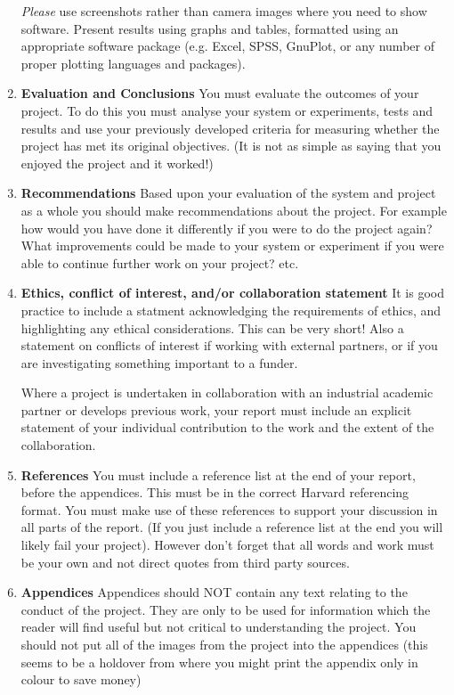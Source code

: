 \begin{enumerate}
    \textit{Please} use screenshots rather than camera images where you need to show software. Present results using graphs and tables, formatted using an appropriate software package (e.g. Excel, SPSS, GnuPlot, or any number of proper plotting languages and packages).

    \item \textbf{Evaluation and Conclusions}
    \subitem You must evaluate the outcomes of your project. To do this you must analyse your system or
    experiments, tests and results and use your previously developed criteria for measuring whether the project has met its original objectives. (It is not as simple as saying that you enjoyed the project and it worked!)
    
    \item \textbf{Recommendations}
    \subitem Based upon your evaluation of the system and project as a whole you should make recommendations about the project. For example how would you have done it differently if you were to do the project again? What improvements could be made to your system or experiment if you were able to continue further work on your project? etc.

    \item \textbf{Ethics, conflict of interest, and/or collaboration statement}
    \subitem It is good practice to include a statment acknowledging the requirements of ethics, and highlighting any ethical considerations. This can be very short! Also a statement on conflicts of interest if working with external partners, or if you are investigating something important to a funder.

    \begin{tcolorbox}
        Where a project is undertaken in collaboration with an industrial academic partner or develops previous work, your report must include an explicit statement of your individual contribution to the work and the extent of the collaboration.
    \end{tcolorbox}
    
    \item \textbf{References}
    \subitem You must include a reference list at the end of your report, before the appendices. This must be in the correct Harvard referencing format. You must make use of these references to support your discussion in all parts of the report. (If you just include a reference list at the end you will likely fail your project). However don’t forget that all words and work must be your own and not direct quotes from third party sources.
    
    \item \textbf{Appendices}
    \subitem Appendices should NOT contain any text relating to the conduct of the project. They are only
    to be used for information which the reader will find useful but not critical to understanding the project. You should not put all of the images from the project into the appendices (this seems to be a holdover from where you might print the appendix only in colour to save money)
\end{enumerate}


